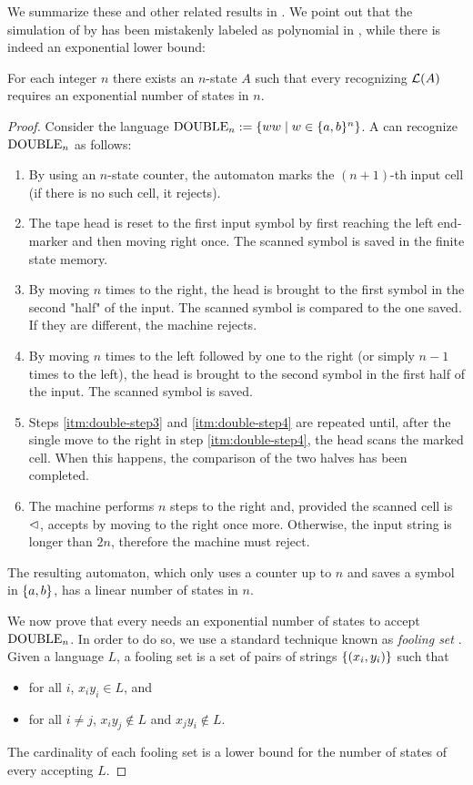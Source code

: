 We summarize these and other related results in .
We point out that the simulation of \OMODLA by \ONFA has been mistakenly labeled as polynomial in \cite{PigPri23a}, while there is indeed an exponential lower bound:
\begin{thrm}\label{thm:OM1DLAto1NFAlower}
	For each integer $n$ there exists an $n$-state \OMODLA $A$ such that every \ONFA recognizing $\mathcal L(A)$ requires an exponential number of states in $n$.
\end{thrm}
\begin{proof}
	Consider the language $\mathrm{DOUBLE}_n:=\{ww\mid w\in\{a,b\}^n\}$.
	A \OMODLA can recognize $\mathrm{DOUBLE}_n$ as follows:
	\begin{enumerate}
		\item By using an $n$-state counter, the automaton marks the $(n+1)$-th input cell (if there is no such cell, it rejects).
		\item The tape head is reset to the first input symbol by first reaching the left end-marker and then moving right once. The scanned symbol is saved in the finite state memory.
		\item\label{itm:double-step3} By moving $n$ times to the right, the head is brought to the first symbol in the second "half" of the input. The scanned symbol is compared to the one saved.
		      If they are different, the machine rejects.
		\item\label{itm:double-step4} By moving $n$ times to the left followed by one to the right (or simply $n-1$ times to the left), the head is brought to the second symbol in the first half of the input. The scanned symbol is saved.
		\item Steps \ref{itm:double-step3} and \ref{itm:double-step4} are repeated until, after the single move to the right in step \ref{itm:double-step4}, the head scans the marked cell. When this happens, the comparison of the two halves has been completed.
		\item The machine performs $n$ steps to the right and, provided the scanned cell is $\lhd$, accepts by moving to the right once more.
		      Otherwise, the input string is longer than $2n$, therefore the machine must reject.
	\end{enumerate}
	The resulting automaton, which only uses a counter up to $n$ and saves a symbol in $\{a,b\}$, has a linear number of states in $n$.

	We now prove that every \ONFA needs an exponential number of states to accept $\mathrm{DOUBLE}_n$.
	In order to do so, we use a standard technique known as \emph{fooling set} \cite{Bir92}.
	Given a language $L$, a fooling set is a set of pairs of strings $\{(x_i,y_i)\}$ such that
	\begin{itemize}
		\item for all $i$, $x_iy_i\in L$, and
		\item for all $i\ne j$, $x_iy_j\notin L$ and $x_jy_i\notin L$.
	\end{itemize}
	The cardinality of each fooling set is a lower bound for the number of states of every \ONFA accepting $L$.


\end{proof}

